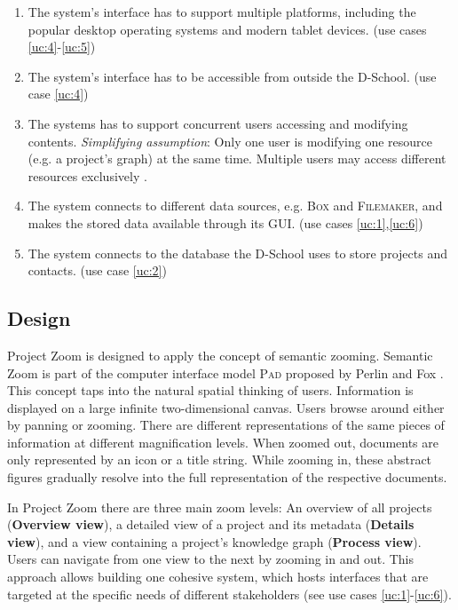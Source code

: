 \begin{enumerate}
\item The system's interface has to support multiple platforms, including the popular desktop operating systems and modern tablet devices. (use cases \ref{uc:4}-\ref{uc:5}) \label{req:1}
\item The system's interface has to be accessible from outside the D-School. (use case \ref{uc:4}) \label{req:2}
\item The systems has to support concurrent users accessing and modifying contents. \textit{Simplifying assumption}: Only one user is modifying one resource (e.g. a project's graph) at the same time. Multiple users may access different resources exclusively . \label{req:3}
\item The system connects to different data sources, e.g. \textsc{Box} and \textsc{Filemaker}, and makes the stored data available through its GUI. (use cases \ref{uc:1},\ref{uc:6}) \label{req:4}
\item The system connects to the database the D-School uses to store projects and contacts. (use case \ref{uc:2}) \label{req:4}

\end{enumerate}

\subsection{Design}
\label{sec:design}

Project Zoom is designed to apply the concept of semantic zooming. Semantic Zoom is part of the computer interface model \textsc{Pad} proposed by Perlin and Fox \cite{Perlin_1993}. This concept taps into the natural spatial thinking of users. Information is displayed on a large infinite two-dimensional canvas. Users browse around either by panning or zooming. There are different representations of the same pieces of information at different magnification levels. When zoomed out, documents are only represented by an icon or a title string. While zooming in, these abstract figures gradually resolve into the full representation of the respective documents. 

In Project Zoom there are three main zoom levels: An overview of all projects (\textbf{Overview view}), a detailed view of a project and its metadata (\textbf{Details view}), and a view containing a project's knowledge graph (\textbf{Process view}). Users can navigate from one view to the next by zooming in and out. This approach allows building one cohesive system, which hosts interfaces that are targeted at the specific needs of different stakeholders (see use cases \ref{uc:1}-\ref{uc:6}). 

